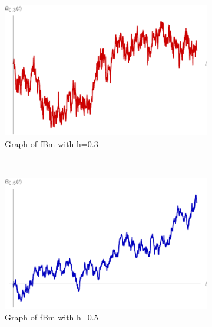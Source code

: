 \begin{figure}[h]
	\centering
	\begin{subfigure}[b]{0.3\textwidth}
		\includegraphics[width=\textwidth]{pics/ch-brownian/fbm0_3.pdf}
		\caption{Graph of fBm with h=0.3}
		\label{fig:fbm3}
	\end{subfigure}
	~ %
	\begin{subfigure}[b]{0.3\textwidth}
		\includegraphics[width=\textwidth]{pics/ch-brownian/fbm0_5.pdf}
		\caption{Graph of fBm with h=0.5}
		\label{fig:fbm5}
	\end{subfigure}
	~ %
	\begin{subfigure}[b]{0.3\textwidth}

\end{subfigure}
\end{figure}
